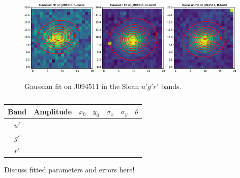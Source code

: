 \documentclass[a4paper,11pt]{article}
\begin{document}
\begin{figure}[t]
    \includegraphics[width=0.32\textwidth]{gauss_fit_wcs_U_stack.eps}
    \includegraphics[width=0.32\textwidth]{gauss_fit_wcs_G_stack.eps}
    \includegraphics[width=0.32\textwidth]{gauss_fit_wcs_R_stack.eps}
    \caption{Gaussian fit on J094511 in the Sloan $u'g'r'$ bands.}
    \label{fig:gauss_fit_wcs_stack}
\end{figure}

\begin{table}[h!]
    \centering
    \begin{tabular}{| c | l | l | l | l | l | l |} \hline
        Band & Amplitude & $x_0$ & $y_0$ & $\sigma_x$ & $\sigma_y$ & $\theta$ \\ \hline \hline
        $u'$ &  &  &  &  &  &  \\
        $g'$ &  &  &  &  &  &  \\
        $r'$ &  &  &  &  &  &  \\ \hline
    \end{tabular}
    \caption{}
    \label{tab:wcs_gaussians}
\end{table}

Discuss fitted parameters and errors here!
\end{document}
